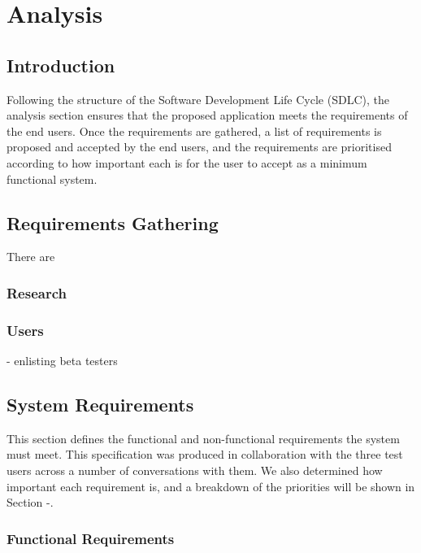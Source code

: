 \chapter{Analysis}
\section{Introduction}
Following the structure of the Software Development Life Cycle (SDLC), the analysis section ensures that the proposed application meets the requirements of the end users. Once the requirements are gathered, a list of requirements is proposed and accepted by the end users, and the requirements are prioritised according to how important each is for the user to accept as a minimum functional system. 

\section{Requirements Gathering}
There are 

\subsection{Research}

\subsection{Users}
- enlisting beta testers

\pagebreak
\section{System Requirements}
This section defines the functional and non-functional requirements the system must meet. This specification was produced in collaboration with the three test users across a number of conversations with them. We also determined how important each requirement is, and a breakdown of the priorities will be shown in Section -.

\subsection{Functional Requirements}

